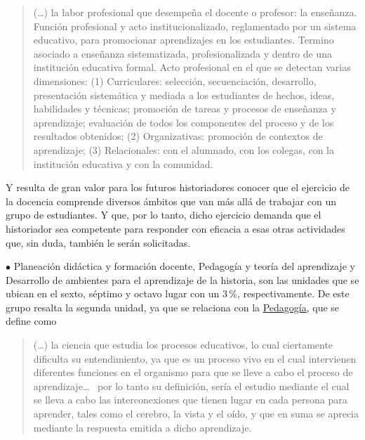 \begin{quotation}
(\ldots) la labor profesional que desempeña el docente o profesor: la 
enseñanza. Función profesional y acto institucionalizado, reglamentado 
por un sistema educativo, para promocionar aprendizajes en los 
estudiantes. Termino asociado a enseñanza sistematizada, 
profesionalizada y dentro de una institución educativa formal. Acto 
profesional en el que se detectan varias dimensiones: (1) Curriculares: 
selección, secuenciación, desarrollo, presentación \textemdash{}sistemática y 
mediada\textemdash{}  a los estudiantes de hechos, ideas, habilidades y técnicas; 
promoción de tareas y procesos de enseñanza y aprendizaje; evaluación 
de todos los componentes del proceso y de los resultados obtenidos; (2) 
Organizativas: promoción de contextos de aprendizaje; (3) Relacionales: 
con el alumnado, con los colegas, con la institución educativa y con la 
comunidad. 
\end{quotation}

Y resulta de gran valor para los futuros historiadores conocer que el 
ejercicio de la docencia comprende diversos ámbitos que van más allá de 
trabajar con un grupo de estudiantes. Y que, por lo tanto, dicho  ejercicio
demanda que el historiador sea competente para responder con eficacia 
a esas otras actividades que, sin duda, también le serán solicitadas.

\begin{Obs} 
\item[$\bullet$] Planeación didáctica y formación docente,  
Pedagogía y teoría del aprendizaje y Desarrollo de ambientes para el 
aprendizaje de la historia, son las unidades que se ubican en el sexto, 
séptimo y octavo lugar con un 3\,\%, respectivamente. De este grupo 
resalta la segunda unidad, ya que se relaciona con la 
\href{http://www.definicion.org/pedagogia}{Pedagogía}, que se define como 
\end{Obs}

\begin{quotation}
(\ldots) la ciencia que estudia los procesos educativos, lo cual ciertamente 
dificulta su entendimiento, ya que es un proceso vivo en el cual 
intervienen diferentes funciones en el organismo para que se lleve a 
cabo el proceso de aprendizaje\ldots{} \, por lo tanto su definición, sería el 
estudio mediante el cual se lleva a cabo las interconexiones que tienen 
lugar en cada persona para aprender, tales como el cerebro, la vista y 
el oído, y que en suma se aprecia mediante la respuesta emitida a dicho 
aprendizaje.
\end{quotation}
\newpage

